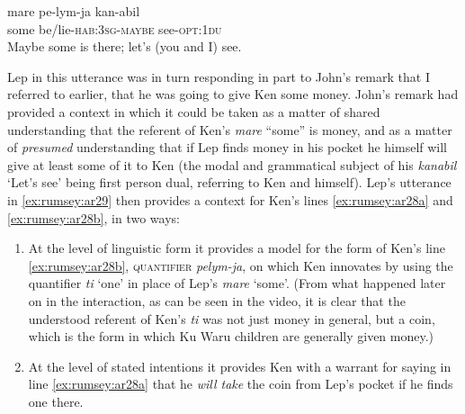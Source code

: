\documentclass[output=paper]{langsci/langscibook}
\begin{document}
\begin{exe}
	\ex \label{ex:rumsey:ar29}
	\gll mare pe-lym-ja kan-abil\\
	some be/lie-\textsc{hab}:3\textsc{sg}-\textsc{maybe} see-\textsc{opt}:1\textsc{du}\\
	\trans Maybe some is there; let’s (you and I) see.
\end{exe}

Lep in this utterance was in turn responding in part to John’s remark that I referred to earlier, that he was going to give Ken some money. John’s remark had provided a context in which it could be taken as a matter of shared understanding that the referent of Ken’s \emph{mare} “some” is money, and as a matter of \emph{presumed} understanding that if Lep finds money in his pocket he himself will give at least some of it to Ken (the modal and grammatical subject of his \textit{kanabil} ‘Let’s see’ being first person dual, referring to Ken and himself). Lep’s utterance in \ref{ex:rumsey:ar29} then provides a context for Ken’s lines \ref{ex:rumsey:ar28a} and \ref{ex:rumsey:ar28b}, in two ways:

\begin{enumerate}[label=\arabic*)]
	\item At the level of linguistic form it provides a model for the form of Ken’s line \ref{ex:rumsey:ar28b}, \textsc{quantifier} \textit{pelym-ja}, on which Ken innovates by using the quantifier \textit{ti} ‘one’ in place of Lep’s \textit{mare} ‘some’. (From what happened later on in the interaction, as can be seen in the video, it is clear that the understood referent of Ken’s \textit{ti} was not just money in general, but a coin, which is the form in which Ku Waru children are generally given money.)
	\item At the level of stated intentions it provides Ken with a warrant for saying in line \ref{ex:rumsey:ar28a} that he \emph{will take} the coin from Lep’s pocket if he finds one there.
\end{enumerate}
\end{document}
